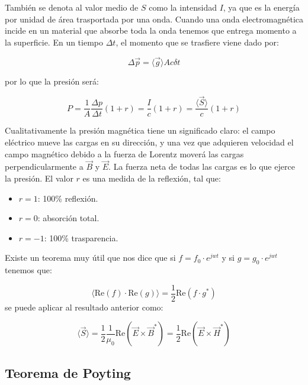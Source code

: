 \documentclass[12pt,a4paper]{article}
\newcommand{\Real}{\mathrm{Re}}
\begin{document}
También se denota al valor medio de $S$ como la intensidad $I$, ya que es la energía por unidad de área trasportada por una onda. Cuando una onda electromagnética incide en un material que absorbe toda la onda tenemos que entrega momento a la superficie. En un tiempo $\Delta t$, el momento que se trasfiere viene dado por:

\begin{equation}
\Delta \vec{p} = \langle \vec{g} \rangle A c \delta t
\end{equation} 

por lo que la presión será:

\begin{equation}
P = \dfrac{1}{A} \dfrac{\Delta p}{\Delta t} (1+r) = \dfrac{I}{c} (1+r) = \dfrac{\langle \vec{S} \rangle}{c} (1+r) 
\end{equation}

Cualitativamente la presión magnética tiene un significado claro: el campo eléctrico mueve las cargas en su dirección, y una vez que adquieren velocidad el campo magnético debido a la fuerza de Lorentz moverá las cargas perpendicularmente a $\vec{B}$ y $\vec{E}$. La fuerza neta de todas las cargas es lo que ejerce la presión. El valor $r$ es una medida de la reflexión, tal que:

\begin{itemize}
\item $r=1$: 100\% reflexión.
\item $r=0$: absorción total.
\item $r=-1$: 100\% trasparencia.
\end{itemize}

Existe un teorema muy útil que nos dice que si $f=f_0 \cdot e^{jwt}$ y si $g = g_0 \cdot e^{jwt}$ tenemos que:

\begin{equation}
\langle \Real (f) \cdot \Real (g) \rangle = \dfrac{1}{2} \Real (f \cdot g ^*)
\end{equation}
se puede aplicar al resultado anterior como:

\begin{equation}
\langle \vec{S} \rangle = \dfrac{1}{2} \dfrac{1}{\mu_0} \Real (\vec{E} \times \vec{B}^* ) = \dfrac{1}{2} \Real (\vec{E} \times \vec{H}^*) 
\end{equation}

\subsection{Teorema de Poyting}
\end{document}
